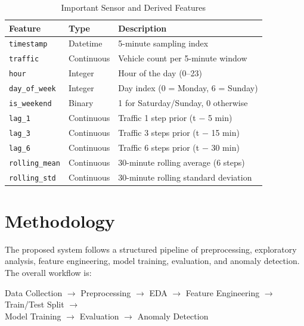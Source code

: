 \documentclass[12pt,a4paper]{article}
\begin{document}
\begin{table}[H]
  \centering
  \caption{Important Sensor and Derived Features}
  \label{tab:features}
  \renewcommand{\arraystretch}{1.3}
  \begin{tabular}{lll}
    \toprule
    \textbf{Feature} & \textbf{Type} & \textbf{Description} \\
    \midrule
    \texttt{timestamp}    & Datetime   & 5-minute sampling index \\
    \texttt{traffic}      & Continuous & Vehicle count per 5-minute window \\
    \texttt{hour}         & Integer    & Hour of the day (0--23) \\
    \texttt{day\_of\_week}& Integer    & Day index (0 = Monday, 6 = Sunday) \\
    \texttt{is\_weekend}  & Binary     & 1 for Saturday/Sunday, 0 otherwise \\
    \texttt{lag\_1}       & Continuous & Traffic 1 step prior (t $-$ 5 min) \\
    \texttt{lag\_3}       & Continuous & Traffic 3 steps prior (t $-$ 15 min) \\
    \texttt{lag\_6}       & Continuous & Traffic 6 steps prior (t $-$ 30 min) \\
    \texttt{rolling\_mean}& Continuous & 30-minute rolling average (6 steps) \\
    \texttt{rolling\_std} & Continuous & 30-minute rolling standard deviation \\
    \bottomrule
  \end{tabular}
\end{table}

\section{Methodology}

The proposed system follows a structured pipeline of preprocessing, exploratory
analysis, feature engineering, model training, evaluation, and anomaly detection.
The overall workflow is:

\medskip
\begin{center}
  Data Collection $\rightarrow$ Preprocessing $\rightarrow$ EDA $\rightarrow$
  Feature Engineering $\rightarrow$ Train/Test Split $\rightarrow$\\
  Model Training $\rightarrow$ Evaluation $\rightarrow$ Anomaly Detection
\end{center}
\medskip
\end{document}
